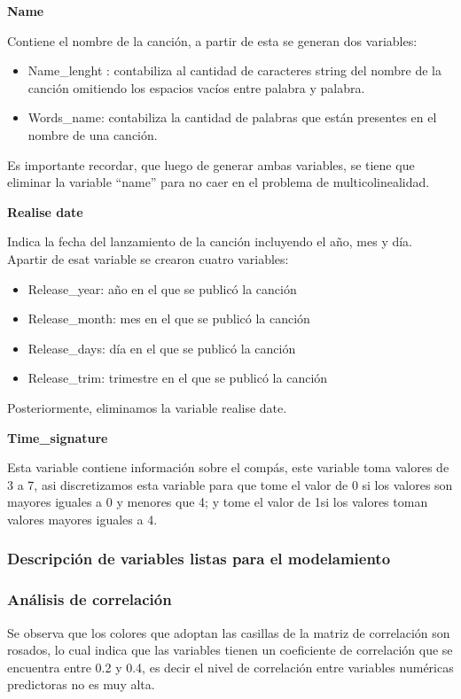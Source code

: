 \documentclass[
  letterpaper,
  DIV=11,
  numbers=noendperiod]{scrartcl}
\providecommand{\tightlist}{%
  \setlength{\itemsep}{0pt}\setlength{\parskip}{0pt}}
\begin{document}
\textbf{Name}

Contiene el nombre de la canción, a partir de esta se generan dos
variables:

\begin{itemize}
\tightlist
\item
  Name\_lenght : contabiliza al cantidad de caracteres string del nombre
  de la canción omitiendo los espacios vacíos entre palabra y palabra.
\item
  Words\_name: contabiliza la cantidad de palabras que están presentes
  en el nombre de una canción.
\end{itemize}

Es importante recordar, que luego de generar ambas variables, se tiene
que eliminar la variable ``name'' para no caer en el problema de
multicolinealidad.

\textbf{Realise date}

Indica la fecha del lanzamiento de la canción incluyendo el año, mes y
día. Apartir de esat variable se crearon cuatro variables:

\begin{itemize}
\tightlist
\item
  Release\_year: año en el que se publicó la canción
\item
  Release\_month: mes en el que se publicó la canción
\item
  Release\_days: día en el que se publicó la canción
\item
  Release\_trim: trimestre en el que se publicó la canción
\end{itemize}

Posteriormente, eliminamos la variable realise date.

\textbf{Time\_signature}

Esta variable contiene información sobre el compás, este variable toma
valores de 3 a 7, asi discretizamos esta variable para que tome el valor
de 0 si los valores son mayores iguales a 0 y menores que 4; y tome el
valor de 1si los valores toman valores mayores iguales a 4.

\hypertarget{descripciuxf3n-de-variables-listas-para-el-modelamiento}{%
\subsubsection{Descripción de variables listas para el
modelamiento}\label{descripciuxf3n-de-variables-listas-para-el-modelamiento}}

\hypertarget{anuxe1lisis-de-correlaciuxf3n}{%
\subsubsection{Análisis de
correlación}\label{anuxe1lisis-de-correlaciuxf3n}}

Se observa que los colores que adoptan las casillas de la matriz de
correlación son rosados, lo cual indica que las variables tienen un
coeficiente de correlación que se encuentra entre 0.2 y 0.4, es decir el
nivel de correlación entre variables numéricas predictoras no es muy
alta.
\end{document}
